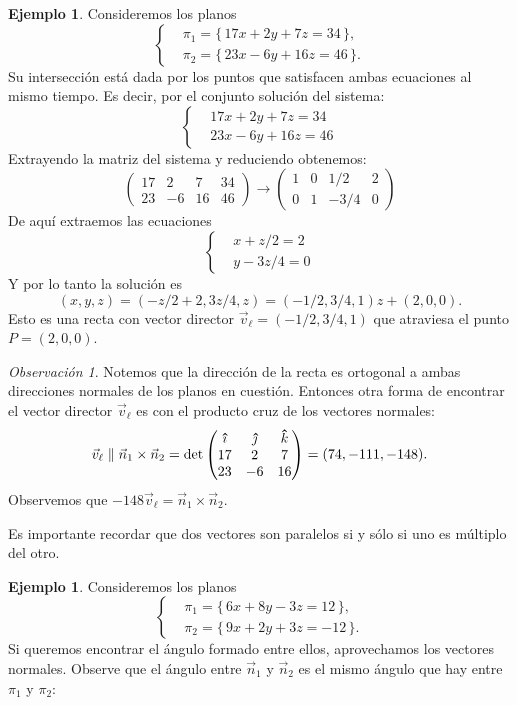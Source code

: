 \documentclass[12pt]{article}
\theoremstyle{plain}
\theoremstyle{definition}
\newtheorem{Ex}[Th]{Ejemplo}           %
\theoremstyle{remark}
\newtheorem*{Rmk}{Observación}      %
\renewcommand{\l}{\ell}
\newcommand{\thickhat}[1]{\mathbf{\hat{\text{$#1$}}}}
\newcommand{\ii}{\vu{\imath}}
\newcommand{\jj}{\vu{\jmath}}
\newcommand{\kk}{\thickhat{k}}
\newcommand{\x}{\times}             %
\renewcommand{\:}{\colon}           %
\renewcommand{\.}{\Cdot}                %
\newcommand{\threebythree}[9]{\begin{pmatrix} %
  #1 & #2 & #3 \\ #4 & #5 & #6 \\ #7 & #8 & #9 \end{pmatrix}}
\newcommand{\set}[1]{\{\,#1\,\}}    %
\begin{document}
\begin{multicols}{2}
\begin{Ex}
  Consideremos los planos 
  $$
\left\lbrace
\begin{aligned}
  &\pi_1=\set{17x+2y+7z=34},\\
  &\pi_2=\set{23x-6y+16z=46}.
\end{aligned}
\right.
$$
Su intersección está dada por los puntos que satisfacen ambas ecuaciones al mismo tiempo. Es decir, por el conjunto solución del sistema:
$$
\left\lbrace
\begin{aligned}
  &17x+2y+7z=34\\
  &23x-6y+16z=46
\end{aligned}
\right.
$$
Extrayendo la matriz del sistema y reduciendo obtenemos:
$$\left(\begin{array}{ccc|c}
  17&2&7&34\\
  23&-6&16&46
\end{array}\right)\to\left(\begin{array}{ccc|c}
  1&0&1/2&2\\
  0&1&-3/4&0
\end{array}\right)$$
De aquí extraemos las ecuaciones 
$$
\left\lbrace
\begin{aligned}
  &x+z/2=2\\
  &y-3z/4=0
\end{aligned}
\right.
$$
Y por lo tanto la solución es
$$(x,y,z)=\left(-z/2+2,3z/4,z\right)=\left(-1/2,3/4,1\right)z+(2,0,0).$$
Esto es una recta con vector director $\vec{v}_\l=\left(-1/2,3/4,1\right)$ que atraviesa el punto $P=(2,0,0)$.
\end{Ex}

\begin{Rmk}
  Notemos que la dirección de la recta es ortogonal a ambas direcciones normales de los planos en cuestión. Entonces otra forma de encontrar el vector director $\vec v_\l$ es con el producto cruz de los vectores normales:
  $$\vec v_\l\parallel\vec n_1\x\vec n_2=\det\threebythree{\ii}{\jj}{\kk}{17}{2}{7}{23}{-6}{16}=(74, -111, -148).$$
  Observemos que $-148\vec v_\l=\vec n_1\x\vec n_2$.
\end{Rmk}

Es importante recordar que dos vectores son paralelos si y sólo si uno es múltiplo del otro.

\begin{Ex}
  Consideremos los planos 
  $$
\left\lbrace
\begin{aligned}
  &\pi_1=\set{6x+8y-3z=12},\\
  &\pi_2=\set{9x+2y+3z=-12}.
\end{aligned}
\right.
$$
Si queremos encontrar el ángulo formado entre ellos, aprovechamos los vectores normales. Observe que el ángulo entre $\vec n_1$ y $\vec n_2$ es el mismo ángulo que hay entre $\pi_1$ y $\pi_2$:
\begin{center}



\end{center}
\end{Ex}
\end{multicols}
\end{document}
